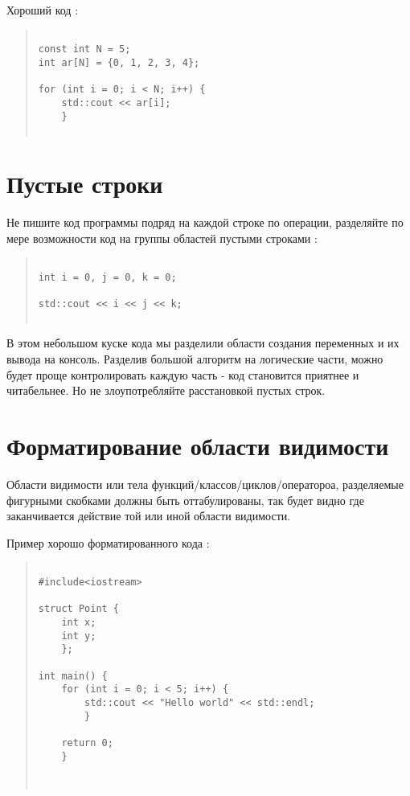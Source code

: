 Хороший код :
\begin{quote}
\begin{verbatim}
 
const int N = 5;
int ar[N] = {0, 1, 2, 3, 4};

for (int i = 0; i < N; i++) {
    std::cout << ar[i];
    }
 
\end{verbatim}
\end{quote}

\section{  Пустые строки }

Не пишите код программы подряд на каждой строке по операции, разделяйте по мере возможности код на группы областей пустыми строками :
\begin{quote}
\begin{verbatim}
 
int i = 0, j = 0, k = 0;

std::cout << i << j << k;
 
\end{verbatim}
\end{quote}
В этом небольшом куске кода мы разделили области создания переменных и их вывода на консоль. Разделив большой алгоритм на логические части, можно будет проще контролировать каждую часть - код становится приятнее и читабельнее. Но не злоупотребляйте расстановкой пустых строк.

\section{  Форматирование области видимости }

Области видимости или тела функций/классов/циклов/оператороа, разделяемые фигурными скобками должны быть оттабулированы, так будет видно где заканчивается действие той или иной области видимости.

Пример хорошо форматированного кода :

\begin{quote}
\begin{verbatim}
 
#include<iostream>

struct Point {
    int x;
    int y;
    };

int main() {     
    for (int i = 0; i < 5; i++) {
        std::cout << "Hello world" << std::endl;
        }
            
    return 0;
    }

 
\end{verbatim}
\end{quote}

